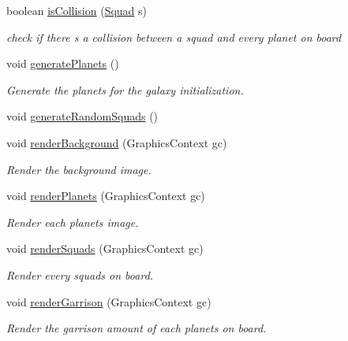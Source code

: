 \begin{DoxyCompactItemize}
boolean \hyperlink{classfr_1_1projet_1_1groupe40_1_1model_1_1board_1_1_galaxy_af0fc1142e337409617e0508c57ecce55}{is\+Collision} (\hyperlink{classfr_1_1projet_1_1groupe40_1_1model_1_1ships_1_1_squad}{Squad} s)
\begin{DoxyCompactList}\small\item\em check if there s a collision between a squad and every planet on board \end{DoxyCompactList}\item 
void \hyperlink{classfr_1_1projet_1_1groupe40_1_1model_1_1board_1_1_galaxy_aff898566fd28de2e9af973395d063790}{generate\+Planets} ()
\begin{DoxyCompactList}\small\item\em Generate the planets for the galaxy initialization. \end{DoxyCompactList}\item 
void \hyperlink{classfr_1_1projet_1_1groupe40_1_1model_1_1board_1_1_galaxy_a587e7baee3f8b1d8806346c100168bac}{generate\+Random\+Squads} ()
\item 
void \hyperlink{classfr_1_1projet_1_1groupe40_1_1model_1_1board_1_1_galaxy_a6c7e549103e7eba271b1beb9fdb36720}{render\+Background} (Graphics\+Context gc)
\begin{DoxyCompactList}\small\item\em Render the background image. \end{DoxyCompactList}\item 
void \hyperlink{classfr_1_1projet_1_1groupe40_1_1model_1_1board_1_1_galaxy_ad5bd6b40a74a4cacb1c6ca2ac92f9d75}{render\+Planets} (Graphics\+Context gc)
\begin{DoxyCompactList}\small\item\em Render each planets image. \end{DoxyCompactList}\item 
void \hyperlink{classfr_1_1projet_1_1groupe40_1_1model_1_1board_1_1_galaxy_a2af7b41f184f8052f51955ac23ee6b7c}{render\+Squads} (Graphics\+Context gc)
\begin{DoxyCompactList}\small\item\em Render every squads on board. \end{DoxyCompactList}\item 
void \hyperlink{classfr_1_1projet_1_1groupe40_1_1model_1_1board_1_1_galaxy_a9d6bfd8ae13a74eb18e9b75fc12ffafd}{render\+Garrison} (Graphics\+Context gc)
\begin{DoxyCompactList}\small\item\em Render the garrison amount of each planets on board. \end{DoxyCompactList}\item 

\end{DoxyCompactItemize}
